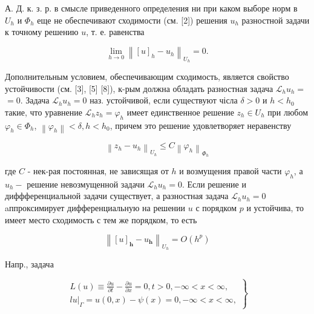 \documentclass[10pt]{article}
\begin{document}
А. Д. к. з. р. в смысле приведенного определения ни при каком выборе норм в $U_{h}$ и $\Phi_{h}$ еще не обеспечивают сходимости (см. [2]) решения $u_{h}$ разностной задачи к точному решению $u$, т. е. равенства



\[

\lim _{h \rightarrow 0}\left\|[u]_{h}-u_{h}\right\|_{U_{h}}=0 .

\]



Дополнительным условием, обеспечивающим сходимость, является свойство устойчивости (см. [3], [5] [8]), к-рым должна обладать разностная задача $\mathscr{L}_{h} u_{h}=$ $=0$. Задача $\mathscr{L}_{h} u_{h}=0$ наз. устойчивой, если существуют чісла $\delta>0$ и $h<h_{0}$ такие, что уравнение $\mathscr{L}_{h} z_{h}=\varphi_{h}$ имеет единственное решение $z_{h} \in U_{h}$ при любом $\varphi_{h} \in \Phi_{h}$, $\left\|\varphi_{h}\right\|<\delta, h<h_{0}$, причем это решение удовлетворяет неравенству



\[

\left\|z_{h}-u_{h}\right\|_{U_{h}} \leqslant C\left\|\varphi_{h}\right\|_{\Phi_{h}}

\]



где $C$ - нек-рая постоянная, не зависящая от $h$ и возмущения правой части $\varphi_{h}$, а $u_{h}-$ решение невозмущенной задачи $\mathscr{L}_{h} u_{h}=0$. Если решение $и$ диффференциальной задачи существует, а разностная задача $\mathscr{L}_{h} u_{h}=0$ aппроксимирует дифференциальную на решении $u$ с порядком $p$ и устойчива, то имеет место сходимость с тем же порядком, то есть



\[

\left\|[u]_{\boldsymbol{h}}-u_{\boldsymbol{h}}\right\|_{U_{h}}=O\left(h^{p}\right)

\]



Напр., задача



\[

\left.\begin{array}{l}

L(u) \equiv \frac{\partial u}{\partial t}-\frac{\partial u}{\partial x}=0, t>0,-\infty<x<\infty, \\

\left.l u\right|_{\Gamma}=u(0, x)-\psi(x)=0,-\infty<x<\infty,

\end{array}\right\}

\]
\end{document}

